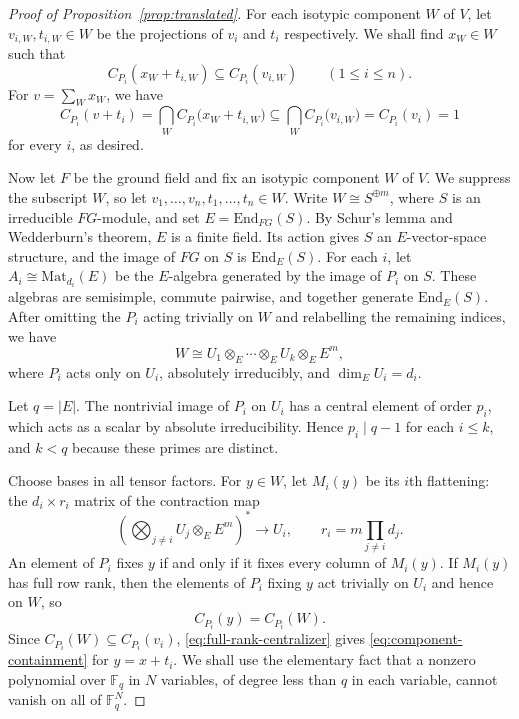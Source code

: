 \documentclass[11pt]{amsart}
\numberwithin{equation}{section}
\theoremstyle{definition}
\theoremstyle{remark}
\begin{document}
\begin{proof}[Proof of Proposition~\ref{prop:translated}]
For each isotypic component $W$ of $V$,
let $v_{i,W},t_{i,W}\in W$ be the projections of $v_i$ and $t_i$ respectively.
We shall find $x_W \in W$ such that
\begin{equation} \label{eq:component-containment}
    C_{P_i}(x_W+t_{i,W}) \subseteq C_{P_i}(v_{i,W})
    \qquad (1\leqslant i\le n).
\end{equation}
For $v=\sum_W x_W$, we have
\[
    C_{P_i}(v+t_i)
    =\bigcap_W C_{P_i}\bigl(x_W+ t_{i,W} \bigr)
    \subseteq \bigcap_W C_{P_i}\bigl(v_{i,W}\bigr)
    =C_{P_i}(v_i)=1
\]
for every $i$, as desired.

Now let $F$ be the ground field and fix an isotypic component $W$ of $V$.
We suppress the subscript $W$, so let $v_1,\ldots,v_n,t_1,\ldots,t_n \in W$.
Write $W \cong S^{\oplus m}$, where $S$ is an irreducible $FG$-module,
and set $E=\mathrm{End}_{FG}(S)$.
By Schur's lemma and Wedderburn's theorem, $E$ is a finite field.
Its action gives $S$ an $E$-vector-space structure,
and the image of $FG$ on $S$ is $\mathrm{End}_E(S)$.
For each $i$, let $A_i \cong \mathrm{Mat}_{d_i}(E)$ be the $E$-algebra generated by the image of $P_i$ on $S$.
These algebras are semisimple, commute pairwise, and together generate $\mathrm{End}_E(S)$.
After omitting the $P_i$ acting trivially on $W$
and relabelling the remaining indices, we have
\[
    W\cong U_1\otimes_E\cdots\otimes_E U_k\otimes_E E^m,
\]
where $P_i$ acts only on $U_i$, absolutely irreducibly, and $\dim_E U_i=d_i$.

Let $q=|E|$.
The nontrivial image of $P_i$ on $U_i$ has a central element of order $p_i$,
which acts as a scalar by absolute irreducibility.
Hence $p_i\mid q-1$ for each $i\leqslant k$, and $k<q$ because these primes are distinct.

Choose bases in all tensor factors.
For $y \in W$, let $M_i(y)$ be its $i$th flattening:
the $d_i\times r_i$ matrix of the contraction map
\[
    \left(\bigotimes_{j\ne i}U_j\otimes_E E^m\right)^*
    \to U_i,
    \qquad
    r_i=m\prod_{j\ne i}d_j.
\]
An element of \(P_i\) fixes \(y\) if and only if it fixes every column of \(M_i(y)\). If \(M_i(y)\) has full row rank, then the elements of \(P_i\) fixing $y$ act trivially on \(U_i\) and hence on \(W\), so
\begin{equation}\label{eq:full-rank-centralizer}
    C_{P_i}(y) = C_{P_i}(W) .
\end{equation}
Since \(C_{P_i}(W)\subseteq C_{P_i}(v_i)\), \eqref{eq:full-rank-centralizer} gives \eqref{eq:component-containment} for $y = x +t_i$.
We shall use the elementary fact that a nonzero polynomial over $\mathbb{F}_q$ in $N$ variables, of degree less than $q$ in each variable, cannot vanish on all of $\mathbb{F}_q^N$.


\end{proof}
\end{document}
